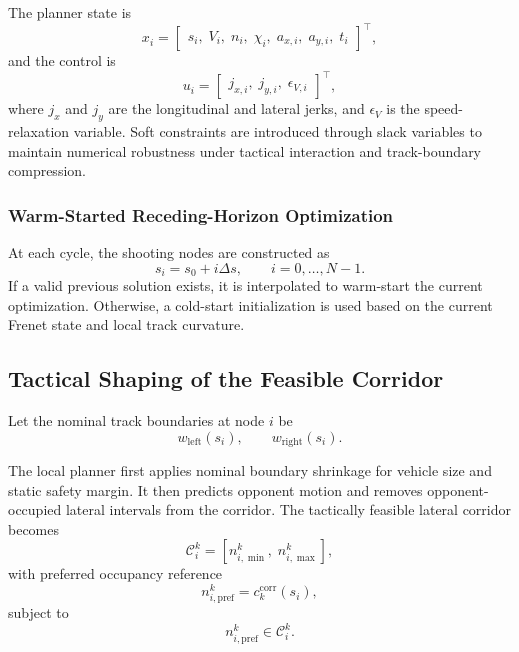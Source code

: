 \documentclass[final ,3p, times]{elsarticle}
\begin{document}
The planner state is
\begin{equation}
x_i =
\begin{bmatrix}
s_i,\;
V_i,\;
n_i,\;
\chi_i,\;
a_{x,i},\;
a_{y,i},\;
t_i
\end{bmatrix}^{\!\top},
\label{eq:planner_state_final}
\end{equation}
and the control is
\begin{equation}
u_i =
\begin{bmatrix}
j_{x,i},\;
j_{y,i},\;
\epsilon_{V,i}
\end{bmatrix}^{\!\top},
\label{eq:planner_control_final}
\end{equation}
where $j_x$ and $j_y$ are the longitudinal and lateral jerks, and $\epsilon_V$ is the speed-relaxation variable. Soft constraints are introduced through slack variables to maintain numerical robustness under tactical interaction and track-boundary compression.

\subsubsection{Warm-Started Receding-Horizon Optimization}

At each cycle, the shooting nodes are constructed as
\begin{equation}
s_i = s_0 + i\Delta s,\qquad i=0,\dots,N-1.
\label{eq:shooting_nodes_final}
\end{equation}
If a valid previous solution exists, it is interpolated to warm-start the current optimization. Otherwise, a cold-start initialization is used based on the current Frenet state and local track curvature.

\subsection{Tactical Shaping of the Feasible Corridor}
\label{subsec:tactical_corridor_shaping}

Let the nominal track boundaries at node $i$ be
\begin{equation}
w_{\mathrm{left}}(s_i),\qquad
w_{\mathrm{right}}(s_i).
\label{eq:nominal_boundaries_final}
\end{equation}

The local planner first applies nominal boundary shrinkage for vehicle size and static safety margin. It then predicts opponent motion and removes opponent-occupied lateral intervals from the corridor. The tactically feasible lateral corridor becomes
\begin{equation}
\mathcal{C}_i^k=
\left[
n_{i,\min}^k,\;
n_{i,\max}^k
\right],
\label{eq:tactical_corridor_interval}
\end{equation}
with preferred occupancy reference
\begin{equation}
n_{i,\mathrm{pref}}^k = c_k^{\mathrm{corr}}(s_i),
\label{eq:preferred_occupancy}
\end{equation}
subject to
\begin{equation}
n_{i,\mathrm{pref}}^k \in \mathcal{C}_i^k.
\label{eq:preferred_occupancy_in_corridor}
\end{equation}
\end{document}
